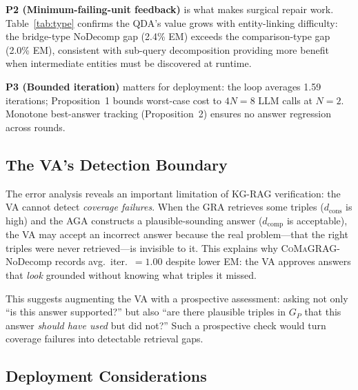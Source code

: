 \documentclass[runningheads]{llncs}
\newcommand{\sys}{\textsc{CoMaGRAG}\xspace}
\begin{document}
\textbf{P2 (Minimum-failing-unit feedback)} is what makes surgical repair
work. Table~\ref{tab:type} confirms the QDA's value grows with entity-linking
difficulty: the bridge-type NoDecomp gap (2.4\% EM) exceeds the comparison-type
gap (2.0\% EM), consistent with sub-query decomposition providing more benefit
when intermediate entities must be discovered at runtime.

\textbf{P3 (Bounded iteration)} matters for deployment: the loop averages
1.59 iterations; Proposition~1 bounds worst-case cost to $4N=8$ LLM calls
at $N=2$. Monotone best-answer tracking (Proposition~2) ensures no answer
regression across rounds.

\subsection{The VA's Detection Boundary}

The error analysis reveals an important limitation of KG-RAG verification:
the VA cannot detect \emph{coverage failures}. When the GRA retrieves some
triples ($d_\text{cons}$ is high) and the AGA constructs a plausible-sounding
answer ($d_\text{comp}$ is acceptable), the VA may accept an incorrect answer
because the real problem---that the right triples were never retrieved---is
invisible to it. This explains why \sys-NoDecomp records avg.\ iter.~$=1.00$
despite lower EM: the VA approves answers that \emph{look} grounded without
knowing what triples it missed.

This suggests augmenting the VA with a prospective assessment: asking not only
``is this answer supported?'' but also ``are there plausible triples in $G_P$
that this answer \emph{should have used} but did not?'' Such a prospective check
would turn coverage failures into detectable retrieval gaps.

\subsection{Deployment Considerations}
\end{document}
